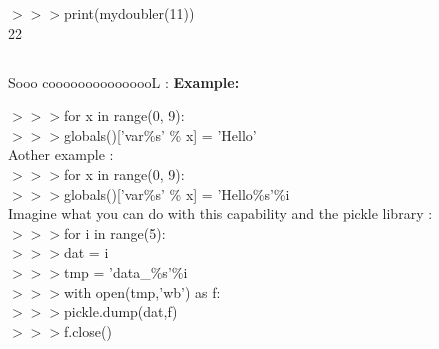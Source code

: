 \documentclass[a4paper,18pt]{article}
\begin{document}
$>>>$print(mydoubler(11))\\

\hspace*{14pt} 22



\subsection{\colorbox {matgreen}{\color{white}{\large Creating a new variable in each iteration of a for loop}}}
Sooo cooooooooooooooL :
\textbf{Example:\\}

$>>>$for x in range(0, 9):\\

$>>>$\hspace*{14pt}globals()['var\%s' \% x] = 'Hello'\\


Aother example : \\

$>>>$for x in range(0, 9):\\

$>>>$\hspace*{14pt}globals()['var\%s' \% x] = 'Hello\%s'\%i\\

Imagine what you can do with this capability and the pickle library :\\

$>>>$for i in range(5):\\

$>>>$\hspace*{14pt}dat = i\\

$>>>$\hspace*{14pt}tmp = 'data\_\%s'\%i\\

$>>>$\hspace*{14pt}with open(tmp,'wb') as f:\\

$>>>$\hspace*{28pt}pickle.dump(dat,f)\\

$>>>$\hspace*{14pt}f.close()\\

\end{document}

